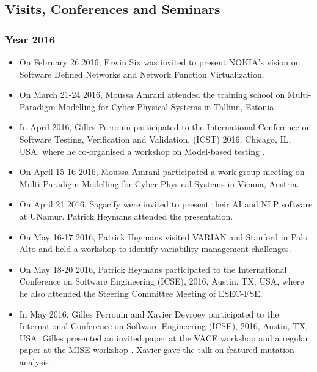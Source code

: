 \subsection{Visits, Conferences and Seminars}

\subsubsection{Year 2016}

\begin{itemize}

\item On February 26 2016, Erwin Six was invited to present NOKIA's vision on Software Defined Networks and Network Function Virtualization. 

\item On March 21-24 2016, Moussa Amrani attended the training school on Multi-Paradigm Modelling for Cyber-Physical Systems in Tallinn, Estonia.

\item In April 2016, Gilles Perrouin participated to the International Conference on Software Testing, Verification and Validation, (ICST) 2016, Chicago, IL, USA, where he co-organised a workshop on Model-based testing \cite{Papadakis16}.

\item On April 15-16 2016, Moussa Amrani participated a work-group meeting on Multi-Paradigm Modelling for Cyber-Physical Systems in Vienna, Austria.

\item On April 21 2016, Sagacify were invited to present their AI and NLP software at UNamur. Patrick Heymans attended the presentation. 

\item On May 16-17 2016, Patrick Heymans visited VARIAN and Stanford in Palo Alto and held a workshop to identify variability management challenges.

\item On May 18-20 2016, Patrick Heymans participated to the International Conference on Software Engineering (ICSE), 2016, Austin, TX, USA, where he also attended the Steering Committee Meeting of ESEC-FSE. 

\item In May 2016, Gilles Perrouin and Xavier Devroey participated to the International Conference on Software Engineering (ICSE), 2016, Austin, TX, USA. Gilles presented an invited paper at the VACE workshop \cite{Perrouin16a} and a regular paper at the MISE workshop \cite{Perrouin16}. Xavier gave the talk on featured mutation analysis \cite{Devorey16a}.


\end{itemize}
